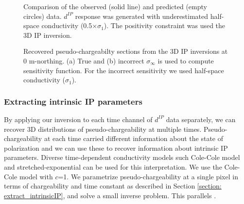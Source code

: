 \documentclass[extra,mreferee]{gji}
\newcommand{\siginf}{\sigma_\infty}
\newcommand{\dip}{d^{IP}}
\begin{document}
\begin{figure}
  \caption{Comparison of the observed (solid line) and predicted (empty circles) data. $\dip$ response was generated with underestimated half-space conductivity (0.5$\times \sigma_1$). The positivity constraint was used the 3D IP inversion.}
  \label{F:Reg_obspred}
\end{figure}

\begin{figure}
  \caption{Recovered pseudo-chargeabilty sections from the 3D IP inversions at 0 m-northing.  (a) True and (b) incorrect $\siginf$ is used to compute sensitivity function. For the incorrect sensitivity we used half-space conductivity ($\sigma_1$).}
  \label{F:True_vs_approx_sensitivity}
\end{figure}
\clearpage

\subsubsection{Extracting intrinsic IP parameters}
By applying our inversion to each time channel of $\dip$ data separately, we can recover 3D distributions of pseudo-chargeability at multiple times. 
Pseudo-chargeability at each time carried different information about the state of polarization and we can use these to recover information about intrinsic IP parameters. 
Diverse time-dependent conductivity models such Cole-Cole model and stretched-exponential can be used for this interpretation.
We use the Cole-Cole model with $c$=1. 
We parametrize pseudo-chargeability at a single pixel in terms of chargeability and time constant as described in Section \ref{section: extract_intrinsicIP}, and solve a small inverse problem. This parallels \cite[]{Yuval1997,Hordt2006}.
\end{document}
